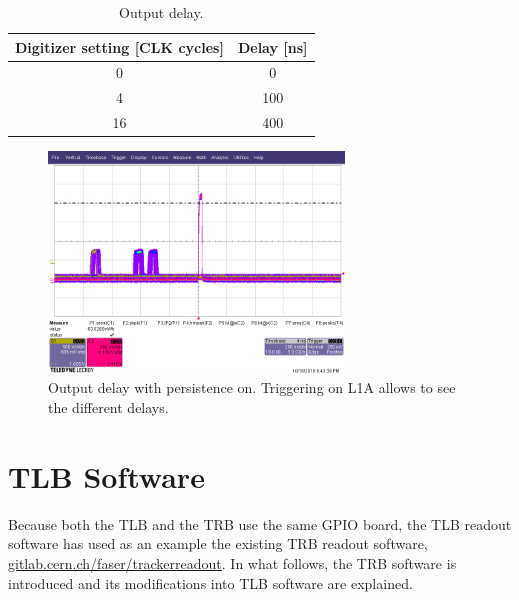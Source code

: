 \begin{table}
\caption{Output delay.}
\centering
\label{table:Outputtable}
\begin{tabular}{c c}
\toprule
Digitizer setting [CLK cycles] & Delay [ns] \\
\midrule
0 & 0\\
4 & 100\\
16 & 400\\
\bottomrule
\end{tabular}
\end{table}

\begin{figure}[htbp!] 
\centering    
\includegraphics[width=0.7\textwidth]{Digitizer_Delay.png}
\caption[Output Delay]{Output delay with persistence on. Triggering on L1A allows to see the different delays.}
\label{fig:OutputDelay}
\end{figure}


\chapter{TLB Software}

Because both the TLB and the TRB use the same GPIO board, the TLB readout software has used as an example the existing TRB readout software, \href{https://gitlab.cern.ch/faser/trackerreadout}{gitlab.cern.ch/faser/trackerreadout}. In what follows, the TRB software is introduced and its modifications into TLB software are explained.

